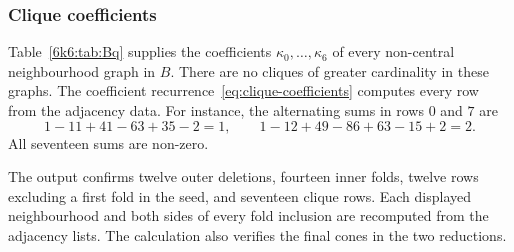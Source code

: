 \subsubsection{Clique coefficients}
Table~\ref{6k6:tab:Bq} supplies the coefficients \(\kappa_0,\ldots,\kappa_6\)
of every non-central neighbourhood graph in \(B\).
There are no cliques of greater cardinality in these graphs.
The coefficient recurrence~\eqref{eq:clique-coefficients}
computes every row from the adjacency data.
For instance, the alternating sums in rows \(0\) and \(7\) are
\[
 1-11+41-63+35-2=1,\qquad
 1-12+49-86+63-15+2=2.
\]
All seventeen sums are non-zero.


The output confirms twelve outer deletions, fourteen inner folds, twelve
rows excluding a first fold in the seed, and seventeen clique rows.
Each displayed neighbourhood and both sides of every fold inclusion are
recomputed from the adjacency lists. The calculation also verifies the
final cones in the two reductions.
